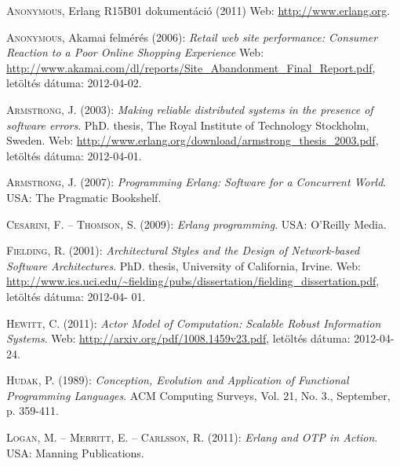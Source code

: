 \documentclass[12pt, a4paper, oneside]{book}
\begin{document}
\begin{thebibliography}{9}

{\scshape Anonymous}, Erlang R15B01 dokumentáció (2011) Web:
\url{http://www.erlang.org}.

{\scshape Anonymous}, Akamai felmérés (2006): \emph{Retail web site performance: Consumer Reaction to a Poor Online
Shopping Experience} Web:
\url{http://www.akamai.com/dl/reports/Site_Abandonment_Final_Report.pdf},
letöltés dátuma: 2012-04-02.

{\scshape Armstrong, J.} (2003): \emph{Making reliable distributed systems in the presence of software errors}. PhD.
thesis, The Royal Institute of Technology Stockholm, Sweden. Web:
\url{http://www.erlang.org/download/armstrong_thesis_2003.pdf}, letöltés
dátuma: 2012-04-01.

{\scshape Armstrong, J.} (2007): \emph{Programming Erlang: Software for a Concurrent World}. USA: The Pragmatic
Bookshelf.

{\scshape Cesarini, F. -- Thomson, S.} (2009): \emph{Erlang programming}. USA: O'Reilly Media.

{\scshape Fielding, R.} (2001): \emph{Architectural Styles and the Design of Network-based Software
Architectures}. PhD. thesis, University of California, Irvine. Web:
\url{http://www.ics.uci.edu/~fielding/pubs/dissertation/fielding_dissertation.pdf}, letöltés dátuma: 2012-04-
01.

{\scshape Hewitt, C.} (2011): \emph{Actor Model of Computation: Scalable Robust
Information Systems}. Web: \url{http://arxiv.org/pdf/1008.1459v23.pdf},
letöltés dátuma: 2012-04-24.

{\scshape Hudak, P.} (1989): \emph{Conception, Evolution and Application of Functional
Programming Languages}. ACM Computing Surveys, Vol. 21, No. 3., September, p.
359-411.

{\scshape Logan, M. -- Merritt, E. -- Carlsson, R.} (2011): \emph{Erlang and OTP in Action}. USA:
Manning Publications.

\end{thebibliography}

\clearpage
{}
\printindex
\end{document}
